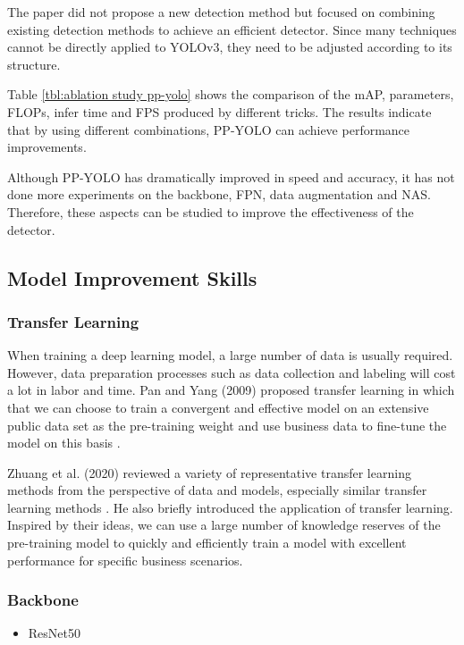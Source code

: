 \documentclass[journal,article,submit,moreauthors,pdftex]{Definitions/mdpi}
\begin{document}
The paper did not propose a new detection method but focused on combining existing detection methods to achieve an efficient detector. Since many techniques cannot be directly applied to YOLOv3, they need to be adjusted according to its structure.

Table \ref{tbl:ablation study pp-yolo} shows the comparison of the mAP, parameters, FLOPs, infer time and FPS produced by different tricks. The results indicate that by using different combinations, PP-YOLO can achieve performance improvements.

Although PP-YOLO has dramatically improved in speed and accuracy, it has not done more experiments on the backbone, FPN, data augmentation and NAS. Therefore, these aspects can be studied to improve the effectiveness of the detector.



\subsection{Model Improvement Skills}
\subsubsection{Transfer Learning}

When training a deep learning model, a large number of data is usually required. However, data preparation processes such as data collection and labeling will cost a lot in labor and time.
Pan and Yang (2009) proposed transfer learning in which that we can choose to train a convergent and effective model on an extensive public data set as the pre-training weight and use business data to fine-tune the model on this basis \cite{pan2009survey}.

Zhuang et al. (2020) reviewed a variety of representative transfer learning methods from the perspective of data and models, especially similar transfer learning methods \cite{zhuang2020comprehensive}. He also briefly introduced the application of transfer learning.
Inspired by their ideas, we can use a large number of knowledge reserves of the pre-training model to quickly and efficiently train a model with excellent performance for specific business scenarios.


\subsubsection{Backbone}

\begin{itemize}
\item ResNet50
\end{itemize}
\end{document}
